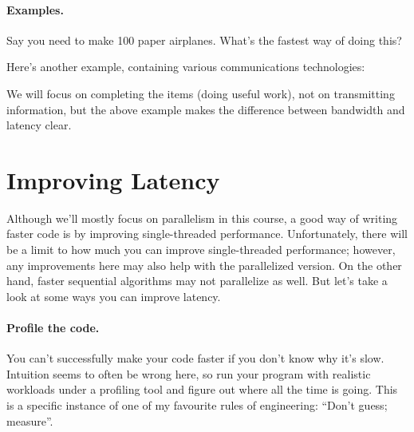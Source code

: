 \documentclass[a4paper]{report}
\begin{document}
\paragraph{Examples.} Say you need to make
100 paper airplanes. What's the fastest way of doing this?

\vspace*{7em}

Here's another example, containing various communications technologies:

\begin{center}
\end{center}


We will focus on completing the items (doing useful work), not on transmitting information, but the above example makes the difference between bandwidth and latency clear.

\section*{Improving Latency}
Although we'll mostly focus on parallelism in this course, a
good way of writing faster code is by improving single-threaded 
performance. Unfortunately, there will be a limit to how much you can
improve single-threaded performance; however, any improvements here
may also help with the parallelized version. On the other hand, faster
sequential algorithms may not parallelize as well. But let's take a look at some
ways you can improve latency.

\paragraph{Profile the code.} You can't successfully make your code 
faster if you don't know why it's slow. Intuition seems to often be
wrong here, so run your program with realistic workloads under a profiling
tool and figure out where all the time is going. This is a specific instance of one of my favourite rules of engineering: ``Don't guess; measure''. 
\end{document}
